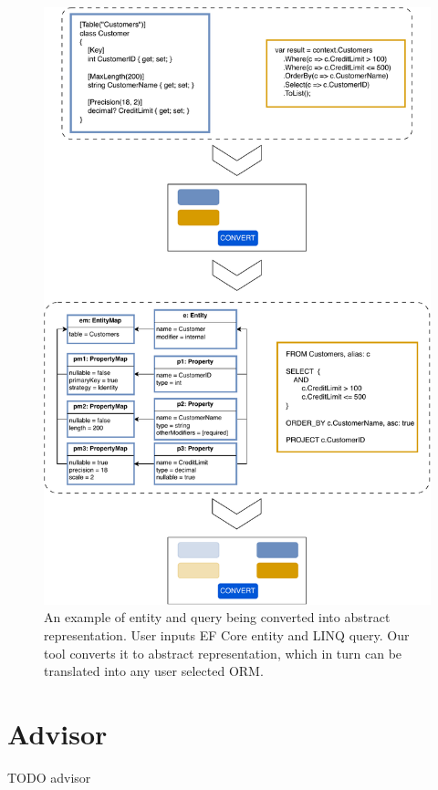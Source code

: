 \begin{figure}[H]
  \centering
  \includegraphics[width=\textwidth]{thesis/img/thesis/03_user_interaction.drawio.pdf}
  \caption{An example of entity and query being converted into abstract representation. User inputs EF Core entity and LINQ query. Our tool converts it to abstract representation, which in turn can be translated into any user selected ORM.}
  \label{fig:orm_to_abstract}
\end{figure}

\section{Advisor}
TODO advisor